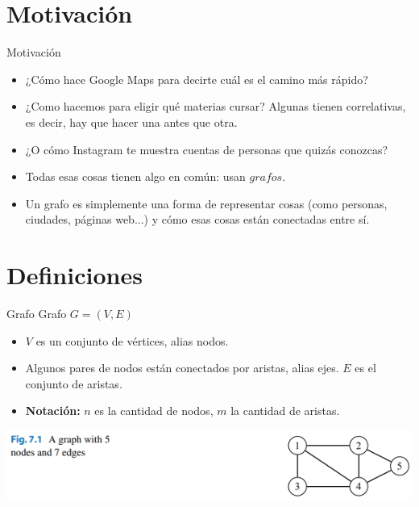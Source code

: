 \documentclass{beamer}
\begin{document}
\section{Motivación}

\begin{frame}{Motivación}
	\begin{itemize}
		\item ¿Cómo hace Google Maps para decirte cuál es el camino más rápido?
		\item ¿Como hacemos para eligir qué materias cursar? Algunas tienen correlativas, es decir, hay que hacer una antes que otra.
		\item ¿O cómo Instagram te muestra cuentas de personas que quizás conozcas?
		\item Todas esas cosas tienen algo en común: usan $grafos$.
		\item Un grafo es simplemente una forma de representar cosas (como personas, ciudades, páginas web...) y cómo esas cosas están conectadas entre sí.
	\end{itemize}
\end{frame}

\section{Definiciones}

\begin{frame}{Grafo}
	Grafo $G = (V,E)$
	\begin{itemize}
		\item $V$ es un conjunto de vértices, alias nodos.
		\item Algunos pares de nodos están conectados por aristas, alias ejes. $E$ es el conjunto de aristas.
		\item \textbf{Notación:} $n$ es la cantidad de nodos, $m$ la cantidad de aristas.
	\end{itemize}
	\begin{center}
		\includegraphics[]{figuras/7.1-grafo.PNG}
	\end{center}
\end{frame}
\end{document}
